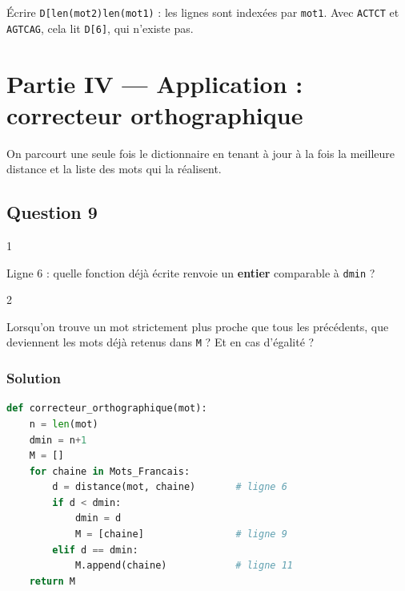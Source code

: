 \documentclass[11pt,a4paper]{article}
\begin{document}
\begin{piege}

Écrire \texttt{D{[}len(\allowbreak{}mot2)\allowbreak{}{]}\allowbreak{}{[}len(\allowbreak{}mot1)\allowbreak{}{]}\allowbreak{}} : les lignes sont indexées par \texttt{mot1}. Avec \texttt{\textquotesingle{}ACTCT\textquotesingle{}} et \texttt{\textquotesingle{}AGTCAG\textquotesingle{}}, cela lit \texttt{D{[}6{]}}, qui n'existe pas.

\end{piege}

\hypertarget{partie-iv-application-correcteur-orthographique}{%
\section{Partie IV --- Application : correcteur orthographique}\label{partie-iv-application-correcteur-orthographique}}

On parcourt une seule fois le dictionnaire en tenant à jour à la fois la meilleure distance et la liste des mots qui la réalisent.

\hypertarget{question-9}{%
\subsection{Question 9}\label{question-9}}

\begin{indication}{1}

Ligne 6 : quelle fonction déjà écrite renvoie un \textbf{entier} comparable à \texttt{dmin} ?

\end{indication}

\begin{indication}{2}

Lorsqu'on trouve un mot strictement plus proche que tous les précédents, que deviennent les mots déjà retenus dans \texttt{M} ? Et en cas d'égalité ?

\end{indication}

\hypertarget{solution-11}{%
\subsubsection{Solution}\label{solution-11}}

\begin{lstlisting}[language=Python]
def correcteur_orthographique(mot):
    n = len(mot)
    dmin = n+1
    M = []
    for chaine in Mots_Francais:
        d = distance(mot, chaine)       # ligne 6
        if d < dmin:
            dmin = d
            M = [chaine]                # ligne 9
        elif d == dmin:
            M.append(chaine)            # ligne 11
    return M
\end{lstlisting}
\end{document}
